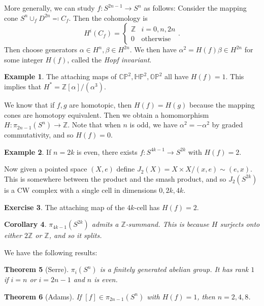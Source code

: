 \documentclass[leqno, openany]{memoir}
\newtheorem{thm}{Theorem}[section]
\newtheorem{cor}[thm]{Corollary}
\theoremstyle{definition}
\newtheorem{exm}[thm]{Example}
\newtheorem{exer}[thm]{Exercise}
\theoremstyle{remark}
\theoremstyle{plain}
\theoremstyle{definition}
\theoremstyle{remark}
\renewcommand{\H}{\mathbb{H}}
\newcommand{\C}{\mathbb{C}}
\newcommand{\Z}{\mathbb{Z}}
\renewcommand{\P}{\mathbb{P}}
\begin{document}
More generally, we can study $f \colon S^{2n-1} \to S^n$ as follows: Consider
the mapping cone $S^n \cup_f D^{2n} \eqqcolon C_f$. Then the cohomology is \[
    H^i(C_f) = \begin{cases} \Z & i = 0, n, 2n \\ 0 & \text{otherwise}
    \end{cases}. \] Then choose generators $\alpha \in H^n, \beta \in H^{2n}$.
    We then have $\alpha^2 = H(f) \beta \in H^{2n}$ for some integer $H(f)$,
    called the \textit{Hopf invariant}.

\begin{exm} The attaching maps of $\C\P^2, \H\P^2, \mathbb{O}\P^2$ all have
$H(f) = 1$. This implies that $H^* = \Z[\alpha]/(\alpha^3)$.  \end{exm}

We know that if $f,g$ are homotopic, then $H(f) = H(g)$ because the mapping
cones are homotopy equivalent. Then we obtain a homomorphism $H \colon
\pi_{2n-1}(S^n) \to \Z$. Note that when $n$ is odd, we have $\alpha^2 =
-\alpha^2$ by graded commutativity, and so $H(f) = 0$.

\begin{exm} If $n = 2k$ is even, there exists $f \colon S^{4k-1} \to S^{2k}$
with $H(f) = 2$.  \end{exm}

Now given a pointed space $(X,e)$ define $J_2(X) = X \times X / (x,e) \sim
(e,x)$. This is somewhere between the product and the smash product, and so
$J_2(S^{2k})$ is a CW complex with a single cell in dimensions $0, 2k, 4k$.

\begin{exer} The attaching map of the $4k$-cell has $H(f) = 2$.  \end{exer}

\begin{cor} $\pi_{4k-1}(S^{2k})$ admits a $\Z$-summand. This is because $H$
surjects onto either $2\Z$ or $\Z$, and so it splits.  \end{cor}

We have the following results:

\begin{thm}[Serre] $\pi_i(S^n)$ is a finitely generated abelian group. It has
rank $1$ if $i = n$ or $i = 2n-1$ and $n$ is even.  \end{thm}

\begin{thm}[Adams] If $[f] \in \pi_{2n-1}(S^n)$ with $H(f) = 1$, then $n =
2,4,8$.  \end{thm}
\end{document}
